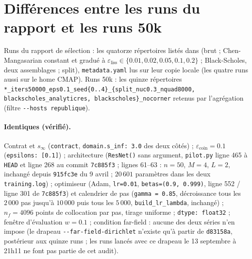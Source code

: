 \documentclass[11pt]{article}
\newcommand{\epscoin}{\varepsilon_{\mathrm{coin}}}
\newcommand{\epsliss}{\varepsilon_{\mathrm{liss}}}
\newcommand{\code}[1]{\texttt{#1}}
\begin{document}
\section{Différences entre les runs du rapport et les runs 50k}
\label{sec:differences}

Runs du rapport de sélection : les quatorze répertoires
 listés dans
 (brut ;
Chen-Mangasarian constant et gradué à $\epsliss\in\{0.01,0.02,0.05,0.1,0.2\}$ ;
Black-Scholes, deux assemblages ; split), \code{metadata.yaml} lus sur leur
copie locale (les quatre runs  aussi sur le home CMAP). Runs 50k : les quinze
répertoires \code{*\_iters50000\_eps0.1\_seed\{0..4\}\_\{split\_nuc0.3\_nquad8000,
blackscholes\_analyticres, blackscholes\}\_nocorner} retenus par l'agrégation
(filtre \code{-{}-hosts republique}).

\paragraph{Identiques (vérifié).} Contrat et $s_\infty$ (\code{contract},
\code{domain.s\_inf: 3.0} des deux côtés) ; $\epscoin=0.1$ (\code{epsilons:
[0.1]}) ; architecture (\code{ResNet()} sans argument, \code{pilot.py}
ligne 465 à \code{HEAD} et ligne 268 au commit \code{7c885f3} ;
 lignes 61--63 : $n=50$,
$M=4$, $L=2$, inchangé depuis \code{915fc3e} du 9 avril ; $20\,601$ paramètres
dans les deux \code{training.log}) ; optimiseur (Adam, \code{lr=0.01},
\code{betas=(0.9, 0.999)}, ligne 552 / ligne 301 de \code{7c885f3}) et
calendrier de pas (\code{gamma = 0.85}, décroissance tous les $2\,000$ pas
jusqu'à $10\,000$ puis tous les $5\,000$, \code{build\_lr\_lambda}, inchangé) ;
$n_f=4096$ points de collocation par pas, tirage uniforme ; \code{dtype:
float32} ; fenêtre d'évaluation $w=0.1$ ; condition far-field : aucune des
deux séries n'en impose (le drapeau \code{-{}-far-field-dirichlet} n'existe qu'à
partir de \code{d83158a}, postérieur aux quinze runs ; les runs lancés avec ce
drapeau le 13 septembre à 21h11 ne font pas partie de cet audit).
\end{document}
